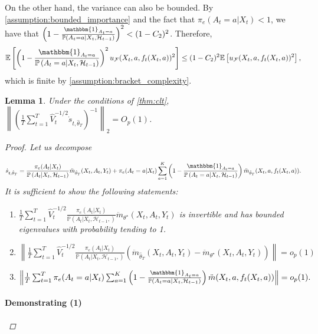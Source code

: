 \documentclass[11pt]{article}
\newcommand{\norm}[1]{\left\lVert#1\right\rVert}
\newtheorem{lemma}{Lemma}
\begin{document}
\begin{appendix}
On the other hand, the variance can also be bounded. By \cref{assumption:bounded_importance} and the fact that $\pi_{e}(A_{t} =a | X_{t}) < 1$, we have that $\left(1 - \frac{\mathbbm{1}_{A_{t} = a} }{\mathbb{P} \left(A_{t} =a | X_{t},\mathcal{H}_{t-1} \right)}\right)^{2} < (1-C_{2})^{2} $. Therefore, 
$$\mathbb{E} \left[\left(1 - \frac{\mathbbm{1}_{A_{t} = a} }{\mathbb{P} \left(A_{t} =a | X_{t},\mathcal{H}_{t-1} \right)}\right)^{2} u_{\mathcal{F}}(X_{t},a,f_{t}(X_{t},a))^{2}\right] \le (1-C_{2})^{2} \mathbb{E}\left[ u_{\mathcal{F}}(X_{t},a,f_{t}(X_{t},a))^{2} \right],$$
which is finite by \cref{assumption:bracket_complexity}. 

\begin{lemma} \label{lemma:invertible}
Under the conditions of \cref{thm:clt}, $\norm{\left( \frac{1}{T}  \sum_{t=1}^{T} \hat{V}_{t}^{-1/2} \dot{s}_{t,\hat{\theta}_{T}}\right)^{-1}}_{2}  = O_{p}(1)$.
\begin{proof}
Let us decompose

$$\dot{s}_{t,\hat{\theta}_{T}} = \frac{\pi_{e}(A_{t} | X_{t})}{\mathbb{P} \left(A_{t} | X_{t},\mathcal{H}_{t-1} \right) }
\ddot{m}_{\hat{\theta}_{T}}(X_{t},A_{t},Y_{t}) + \pi_{e}(A_{t} =a | X_{t})  \sum_{a=1}^{K} \left(1 - \frac{\mathbbm{1}_{A_{t} = a} }{\mathbb{P} \left(A_{t} =a | X_{t},\mathcal{H}_{t-1} \right)}\right) \ddot{m}_{\hat{\theta}_{T}}(X_{t},a,f_{t}(X_{t},a)).$$
It is sufficient to show the following statements:
\begin{enumerate}
    \item $\frac{1}{T} \sum_{t=1}^{T}\hat{V}_{t}^{-1/2}\frac{\pi_{e}(A_{t} | X_{t})}{\mathbb{P} \left(A_{t} | X_{t},\mathcal{H}_{t-1},\right) }
\ddot{m}_{\theta^{\star}}(X_{t},A_{t},Y_{t})$ is invertible and has bounded eigenvalues with probability tending to 1.
    \item $\norm{\frac{1}{T} \sum_{t=1}^{T}\hat{V}_{t}^{-1/2}\frac{\pi_{e}(A_{t} | X_{t})}{\mathbb{P} \left(A_{t} | X_{t},\mathcal{H}_{t-1},\right) }
\left(\ddot{m}_{\hat{\theta}_{T}}(X_{t},A_{t},Y_{t}) - \ddot{m}_{\theta^{\star}}(X_{t},A_{t},Y_{t}) \right)} = o_{p}(1)$ 
    \item $\norm{\frac{1}{T} \sum_{t=1}^{T}\pi_{e}(A_{t} =a | X_{t})  \sum_{a=1}^{K} \left(1 - \frac{\mathbbm{1}_{A_{t} = a} }{\mathbb{P} \left(A_{t} =a | X_{t},\mathcal{H}_{t-1} \right)}\right) \ddot{m}(X_{t},a,f_{t}(X_{t},a))} =o_{p}(1).$
\end{enumerate}
\paragraph{Demonstrating (1)}


\end{proof}
\end{lemma}
\end{appendix}
\end{document}
